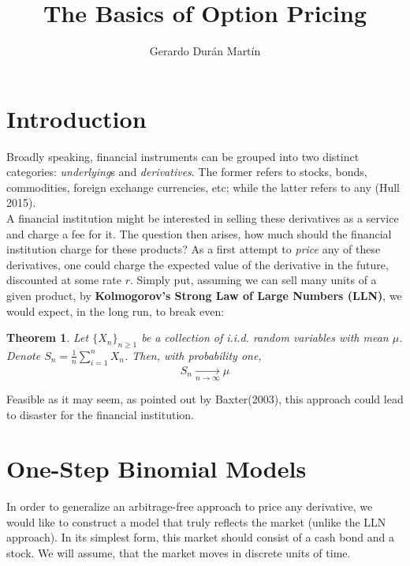 \documentclass{article}
\title{The Basics of Option Pricing}
\author{Gerardo Durán Martín}
\newtheorem{theorem}{Theorem}[section]
\begin{document}
\maketitle


\section{Introduction}
Broadly speaking, financial instruments can be grouped into two distinct categories: \textit{underlying}s and \textit{derivatives}. The former refers to stocks, bonds, commodities, foreign exchange currencies, etc; while the latter refers to any  (Hull 2015).\\

A financial institution might be interested in selling these derivatives as a service and charge a fee for it. The question then arises, how much should the financial institution charge for these products? As a first attempt to \textit{price} any of these derivatives, one could charge the expected value of the derivative in the future, discounted at some rate $r$. Simply put, assuming we can sell many units of a given product, by \textbf{Kolmogorov's Strong Law of Large Numbers (LLN)}, we would expect, in the long run, to break even:

\begin{theorem}
    Let $\{X_n\}_{n\geq 1}$ be a collection of i.i.d. random variables with mean $\mu$. Denote $S_n = \frac{1}{n}\sum_{i=1}^n X_n$. Then, with probability one,
    \begin{equation}
        S_n \xrightarrow[n \rightarrow \infty]{}\mu
    \end{equation}
\end{theorem}


Feasible as it may seem, as pointed out by Baxter(2003), this approach could lead to disaster for the financial institution.


\section{One-Step Binomial Models}
In order to generalize an arbitrage-free approach to price any derivative, we would like to construct a model that truly reflects the market (unlike the LLN approach). In its simplest form, this market should consist of a cash bond and a stock. We will assume, that the market moves in discrete units of time.\\
\end{document}
